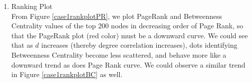 \documentclass{article}
\begin{document}
\begin{enumerate}
\item Ranking Plot \\
From Figure \ref{case1rankplotPR}, we plot PageRank and Betweenness Centrality values of the top 200 nodes in decreasing order of Page Rank, so that the PageRank plot (red color) must be a downward curve. We could see that as $d$ increases (thereby degree correlation increases), dots identifying Betweenness Centrality  become less scattered, and behave more like a downward trend as does Page Rank curve. We could observe a similar trend in Figure \ref{case1rankplotBC} as well.

\begin{figure}[!hbtp]
\hfill
{}
\hfill
{}
\hfill
{}

\end{figure}
\end{enumerate}
\end{document}
